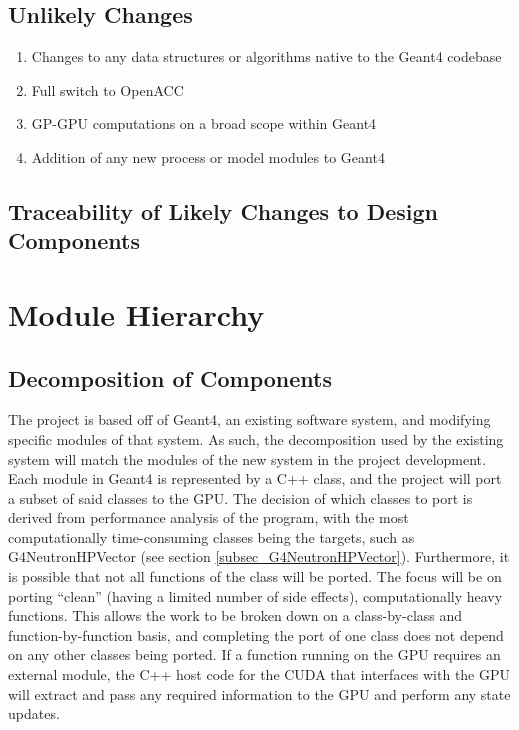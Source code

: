 \documentclass[12pt]{article}
\begin{document}
\subsection{Unlikely Changes} %
\begin{enumerate}
\item Changes to any data structures or algorithms native to the Geant4 codebase
\item Full switch to OpenACC
\item GP-GPU computations on a broad scope within Geant4
\item Addition of any new process or model modules to Geant4
\end{enumerate}

\subsection{Traceability of Likely Changes to Design Components}

\section{Module Hierarchy}%
\subsection{Decomposition of Components}
The project is based off of Geant4, an existing software system, and modifying specific modules of that system. As such, the decomposition used by the existing system will match the modules of the new system in the project development.\\

Each module in Geant4 is represented by a C++ class, and the project will port a subset of said classes to the GPU. The decision of which classes to port is derived from performance analysis of the program, with the most computationally time-consuming classes being the targets, such as G4NeutronHPVector (see section \ref{subsec_G4NeutronHPVector}). Furthermore, it is possible that not all functions of the class will be ported. The focus will be on porting ``clean'' (having a limited number of side effects), computationally heavy functions. This allows the work to be broken down on a class-by-class and function-by-function basis, and completing the port of one class does not depend on any other classes being ported. If a function running on the GPU requires an external module, the C++ host code for the CUDA that interfaces with the GPU will extract and pass any required information to the GPU and perform any state updates.
\end{document}
